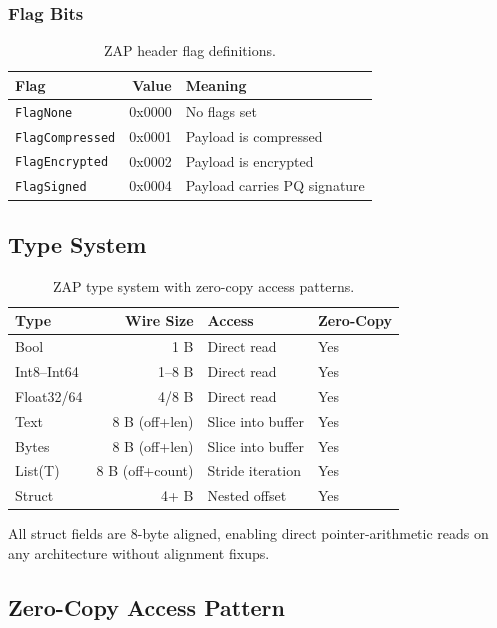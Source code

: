 \documentclass[11pt,letterpaper]{article}
\begin{document}
\subsubsection{Flag Bits}

\begin{table}[H]
\centering
\begin{tabular}{@{}lrl@{}}
\toprule
\textbf{Flag} & \textbf{Value} & \textbf{Meaning} \\
\midrule
\texttt{FlagNone} & 0x0000 & No flags set \\
\texttt{FlagCompressed} & 0x0001 & Payload is compressed \\
\texttt{FlagEncrypted} & 0x0002 & Payload is encrypted \\
\texttt{FlagSigned} & 0x0004 & Payload carries PQ signature \\
\bottomrule
\end{tabular}
\caption{ZAP header flag definitions.}
\label{tab:flags}
\end{table}

\subsection{Type System}

\begin{table}[H]
\centering
\begin{tabular}{@{}lrll@{}}
\toprule
\textbf{Type} & \textbf{Wire Size} & \textbf{Access} & \textbf{Zero-Copy} \\
\midrule
Bool & 1 B & Direct read & Yes \\
Int8--Int64 & 1--8 B & Direct read & Yes \\
Float32/64 & 4/8 B & Direct read & Yes \\
Text & 8 B (off+len) & Slice into buffer & Yes \\
Bytes & 8 B (off+len) & Slice into buffer & Yes \\
List(T) & 8 B (off+count) & Stride iteration & Yes \\
Struct & 4+ B & Nested offset & Yes \\
\bottomrule
\end{tabular}
\caption{ZAP type system with zero-copy access patterns.}
\label{tab:types}
\end{table}

All struct fields are 8-byte aligned, enabling direct pointer-arithmetic reads on any architecture without alignment fixups.

\subsection{Zero-Copy Access Pattern}
\end{document}

